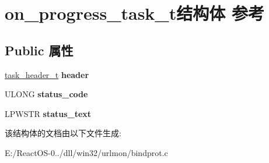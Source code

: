 \hypertarget{structon__progress__task__t}{}\section{on\+\_\+progress\+\_\+task\+\_\+t结构体 参考}
\label{structon__progress__task__t}
\subsection*{Public 属性}
\begin{DoxyCompactItemize}
\item 
\mbox{\label{structon__progress__task__t_a63ed1510dc40573ad749f76e7d217a4e}} 
\hyperlink{structtask__header__t}{task\+\_\+header\+\_\+t} {\bfseries header}
\item 
\mbox{\label{structon__progress__task__t_a60c46039cf42d1fafca1190487dc88c2}} 
U\+L\+O\+NG {\bfseries status\+\_\+code}
\item 
\mbox{\label{structon__progress__task__t_aa55e2febb056f03cd6cc4d3f8dc4a71b}} 
L\+P\+W\+S\+TR {\bfseries status\+\_\+text}
\end{DoxyCompactItemize}


该结构体的文档由以下文件生成\+:\begin{DoxyCompactItemize}
\item 
E\+:/\+React\+O\+S-\/0../dll/win32/urlmon/bindprot.\+c\end{DoxyCompactItemize}
